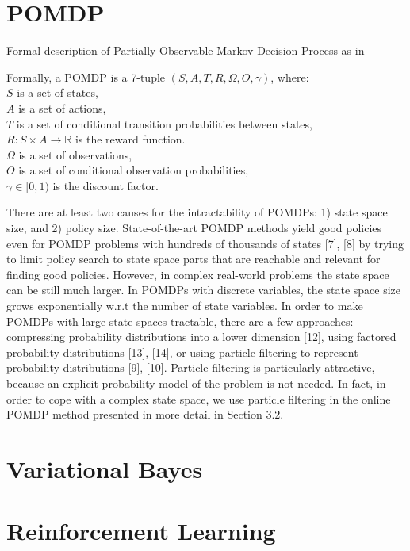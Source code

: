 \documentclass[12pt,a4paper]{article}
\begin{document}
\section{POMDP}
Formal description of Partially Observable Markov Decision Process as in \cite{Spaan2012}

Formally, a POMDP is a 7-tuple $(S,A,T,R,\Omega,O,\gamma)$, where: \\
$S$ is a set of states, \\
$A$ is a set of actions, \\
$T$ is a set of conditional transition probabilities between states, \\
$R: S\times A \rightarrow \mathbb{R}$  is the reward function. \\
$\Omega$ is a set of observations, \\
$O$ is a set of conditional observation probabilities, \\
$\gamma \in [0,1)$ is the discount factor.


There are at least two causes for the intractability of POMDPs: 1) state space size, and 2) policy size. State-of-the-art POMDP
 methods yield good policies even for POMDP problems with hundreds of thousands of states [7], [8] by trying to limit policy 
 search to state space parts that are reachable and relevant for finding good policies. However, in complex real-world problems
  the state space can be still much larger. In POMDPs with discrete variables, the state space size grows exponentially w.r.t 
  the number of state variables. In order to make POMDPs with large state spaces tractable, there are a few approaches: compressing 
  probability distributions into a lower dimension [12], using factored probability distributions [13], [14], or using particle filtering
   to represent probability distributions [9], [10]. Particle filtering is particularly attractive, because an explicit probability model
    of the problem is not needed. In fact, in order to cope with a complex state space, we use particle filtering in the online POMDP method presented in more detail in Section 3.2.
\section{Variational Bayes}
\section{Reinforcement Learning}
\end{document}
